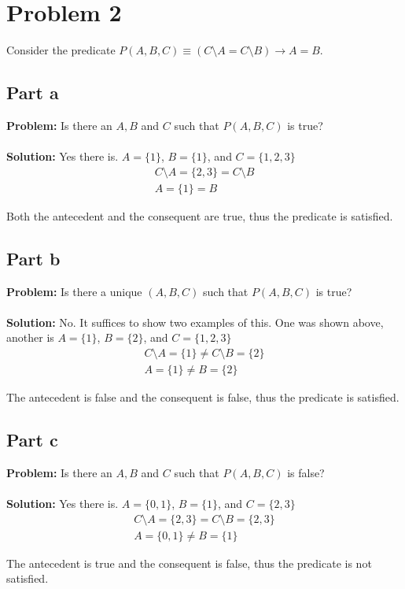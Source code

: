 \documentclass{article}
\begin{document}
\section*{Problem 2}
Consider the predicate $P(A,B,C)\equiv (C\setminus A=C\setminus B)\rightarrow A=B$.
\subsection*{Part a}
\textbf{Problem:} Is there an $A,B$ and $C$ such that $P(A,B,C)$ is true?
\\\\
\textbf{Solution:} Yes there is. $A=\{1\}$, $B=\{1\}$, and $C=\{1,2,3\}$
\begin{gather*}
  C\setminus A=\{2,3\}=C\setminus B\\
  A=\{1\}=B
\end{gather*}

Both the antecedent and the consequent are true, thus the predicate is satisfied.

\subsection*{Part b}
\textbf{Problem:} Is there a unique $(A,B,C)$ such that $P(A,B,C)$ is true?
\\\\
\textbf{Solution:} No. It suffices to show two examples of this. One was shown above, another is $A=\{1\}$, $B=\{2\}$, and $C=\{1,2,3\}$
\begin{gather*}
  C\setminus A=\{1\}\not=C\setminus B=\{2\}\\
  A=\{1\}\not=B=\{2\}
\end{gather*}

The antecedent is false and the consequent is false, thus the predicate is satisfied.

\subsection*{Part c}
\textbf{Problem:} Is there an $A,B$ and $C$ such that $P(A,B,C)$ is false?
\\\\
\textbf{Solution:} Yes there is. $A=\{0,1\}$, $B=\{1\}$, and $C=\{2,3\}$
\begin{gather*}
  C\setminus A=\{2,3\}=C\setminus B=\{2,3\}\\
  A=\{0,1\}\not=B=\{1\}
\end{gather*}

The antecedent is true and the consequent is false, thus the predicate is not satisfied.
\end{document}
